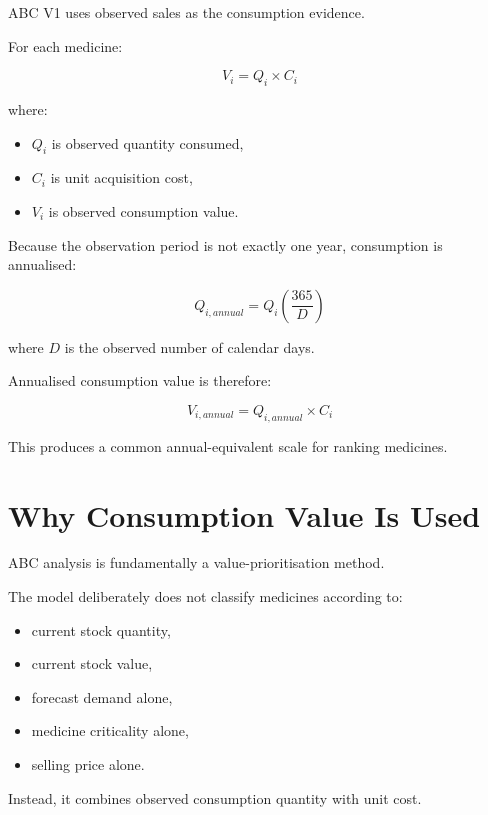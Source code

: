 \documentclass[12pt]{article}
\begin{document}
ABC V1 uses observed sales as the consumption evidence.

For each medicine:

\begin{equation}
V_i = Q_i \times C_i
\end{equation}

where:

\begin{itemize}
    \item $Q_i$ is observed quantity consumed,
    \item $C_i$ is unit acquisition cost,
    \item $V_i$ is observed consumption value.
\end{itemize}

Because the observation period is not exactly one year, consumption is
annualised:

\begin{equation}
Q_{i,annual}
=
Q_i
\left(
\frac{365}{D}
\right)
\end{equation}

where $D$ is the observed number of calendar days.

Annualised consumption value is therefore:

\begin{equation}
V_{i,annual}
=
Q_{i,annual} \times C_i
\end{equation}

This produces a common annual-equivalent scale for ranking medicines.

\section{Why Consumption Value Is Used}

ABC analysis is fundamentally a value-prioritisation method.

The model deliberately does not classify medicines according to:

\begin{itemize}
    \item current stock quantity,
    \item current stock value,
    \item forecast demand alone,
    \item medicine criticality alone,
    \item selling price alone.
\end{itemize}

Instead, it combines observed consumption quantity with unit cost.
\end{document}
